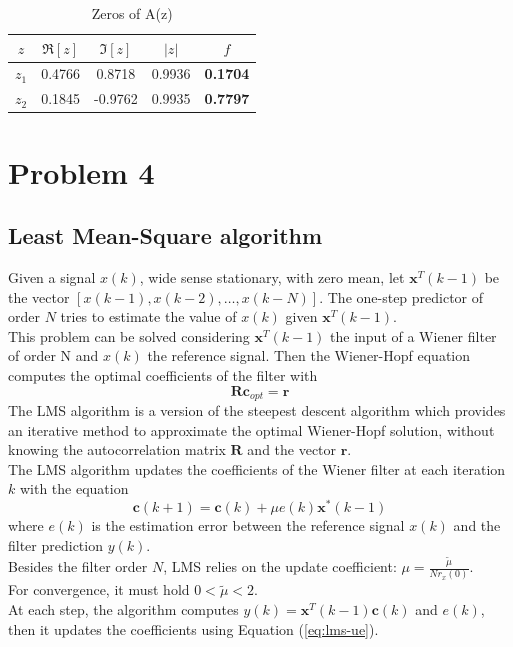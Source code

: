 \documentclass[a4paper, 12pt]{report}
\begin{document}
\begin{table}[H]
\centering
\begin{tabular}{ccccc}
\toprule
$z$		& $\Re[z]$ 	& $\Im[z]$			& $|z|$			& $f$ \\
\midrule
$z_1$ 	& 0.4766	& 0.8718			& 0.9936		& {\bf 0.1704} \\
$z_2$	& 0.1845	& -0.9762			& 0.9935		& {\bf 0.7797} \\
\bottomrule
\end{tabular}
\caption{Zeros of A(z)}
\label{tab:errpred}
\end{table}


\section*{Problem 4}

\subsection*{Least Mean-Square algorithm}
Given a signal $x(k)$, wide sense stationary, with zero mean, let $\mathbf{x}^T(k-1)$ be the vector $[x(k-1), x(k-2), \dots, x(k-N)]$. The one-step predictor of order $N$ tries to estimate the value of $x(k)$ given $\mathbf{x}^T(k-1)$.\\
This problem can be solved considering $\mathbf{x}^T(k-1)$ the input of a Wiener filter of order N and $x(k)$ the reference signal. Then the Wiener-Hopf equation computes the optimal coefficients of the filter with
\begin{equation}
	\mathbf{R} \mathbf{c}_{opt} = \mathbf{r}
\end{equation}
The LMS algorithm is a version of the steepest descent algorithm which provides an iterative method to approximate the optimal Wiener-Hopf solution, without knowing the autocorrelation matrix $\mathbf{R}$ and the vector $\mathbf{r}$.\\
The LMS algorithm updates the coefficients of the Wiener filter at each iteration $k$ with the equation
\begin{equation}\label{eq:lms-ue}
	\mathbf{c}(k+1) = \mathbf{c}(k) + \mu e(k) \mathbf{x}^*(k-1)
\end{equation}
where $e(k)$ is the estimation error between the reference signal $x(k)$ and the filter prediction $y(k)$.\\
Besides the filter order $N$, LMS relies on the update coefficient: $\mu = \frac{\tilde{\mu}}{N r_x(0)}$.\\
For convergence, it must hold $0 < \tilde{\mu} < 2$.\\
At each step, the algorithm computes $ y(k) = \mathbf{x}^T(k-1) \mathbf{c}(k)$ and $e(k)$, then it updates the coefficients using Equation (\ref{eq:lms-ue}).
\end{document}
